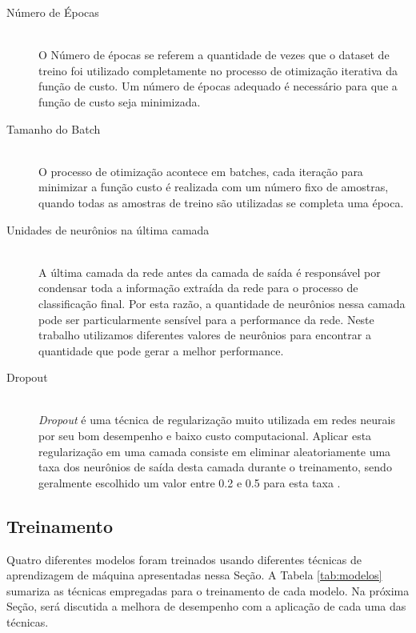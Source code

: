 \documentclass[a4,12pt]{horizon-theme}
\begin{document}
\begin{description}
  \item[Número de Épocas] \hfill \\
        O Número de épocas se referem a quantidade de vezes que o dataset de treino foi utilizado completamente no processo de otimização iterativa da função de custo. Um número de épocas adequado é necessário para que a função de custo seja minimizada.

  \item[Tamanho do Batch] \hfill \\
        O processo de otimização acontece em batches, cada iteração para minimizar a função custo é realizada com um número fixo de amostras, quando todas as amostras de treino são utilizadas se completa uma época.

  \item[Unidades de neurônios na última camada]
        \hfill \\
        A última camada da rede antes da camada de saída é responsável por condensar toda a informação extraída da rede para o processo de classificação final. Por esta razão, a quantidade de neurônios nessa camada pode ser particularmente sensível para a performance da rede. Neste trabalho utilizamos diferentes valores de neurônios para encontrar a quantidade que pode gerar a melhor performance.

  \item[Dropout]
        \hfill \\
        \emph{Dropout} \cite{dropout} é uma técnica de regularização muito utilizada em redes neurais por seu bom desempenho e baixo custo computacional. Aplicar esta regularização em uma camada consiste em eliminar aleatoriamente uma taxa dos neurônios de saída desta camada durante o treinamento, sendo geralmente escolhido um valor entre 0.2 e 0.5 para esta taxa \cite{CholletBook}.
\end{description}



\subsection{Treinamento}
\label{sec:treinamento}
Quatro diferentes modelos foram treinados usando diferentes técnicas de aprendizagem de máquina apresentadas nessa Seção. A Tabela \ref{tab:modelos} sumariza as técnicas empregadas  para o treinamento de cada modelo. Na próxima Seção, será discutida a melhora de desempenho com a aplicação de cada uma das técnicas.
\end{document}
